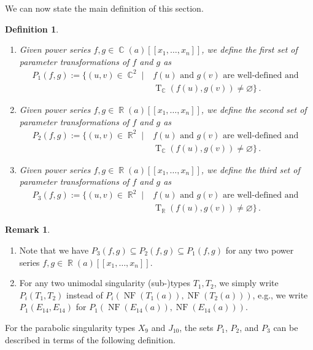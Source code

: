 \documentclass[noend]{amsproc}
\newtheorem{defn}[theorem]{Definition}
\theoremstyle{definition}
\newtheorem{remark}[theorem]{Remark}
\DeclareMathOperator{\R}{\mathbb{R}}
\DeclareMathOperator{\C}{\mathbb{C}}
\DeclareMathOperator{\NF}{NF}
\DeclareMathOperator{\T}{T}
\begin{document}
We can now state the main definition of this section.

\begin{defn}
\leavevmode
\begin{enumerate}
\item
Given power series $f,g \in \C(a)[[x_1,\ldots,x_n]]$, we define the
first set of parameter transformations of $f$ and $g$ as
\begin{align*}
P_1(f, g)
:= \{ (u, v) \in \C^2 \mid
&f(u) \text{ and } g(v) \text{ are well-defined and } \\
&\T_{\C}(f(u), g(v)) \neq \varnothing \} \,.
\end{align*}

\item
Given power series $f,g \in \R(a)[[x_1,\ldots,x_n]]$, we define the
second set of parameter transformations of $f$ and $g$ as
\begin{align*}
P_2(f, g)
:= \{ (u, v) \in \R^2 \mid
&f(u) \text{ and } g(v) \text{ are well-defined and } \\
&\T_{\C}(f(u), g(v)) \neq \varnothing \} \,.
\end{align*}

\item
Given power series $f,g \in \R(a)[[x_1,\ldots,x_n]]$, we define the
third set of parameter transformations of $f$ and $g$ as
\begin{align*}
P_3(f, g)
:= \{ (u, v) \in \R^2 \mid
&f(u) \text{ and } g(v) \text{ are well-defined and } \\
&\T_{\R}(f(u), g(v)) \neq \varnothing \} \,.
\end{align*}
\end{enumerate}
\end{defn}

\begin{remark}
\leavevmode
\begin{enumerate}
\item
Note that we have $P_3(f, g) \subseteq P_2(f, g) \subseteq P_1(f, g)$ for any
two power series $f,g \in \R(a)[[x_1,\ldots,x_n]]$.

\item
For any two unimodal singularity (sub-)types $T_1, T_2$, we simply write
$P_i(T_1,T_2)$ instead of $P_i(\NF(T_1(a)), \NF(T_2(a)))$, e.g., we write
$P_1(E_{14}, E_{14})$ for $P_1(\NF(E_{14}(a)), \NF(E_{14}(a)))$.
\end{enumerate}
\end{remark}

For the parabolic singularity types $X_9$ and $J_{10}$, the sets $P_1$, $P_2$,
and $P_3$ can be described in terms of the following definition.
\end{document}
